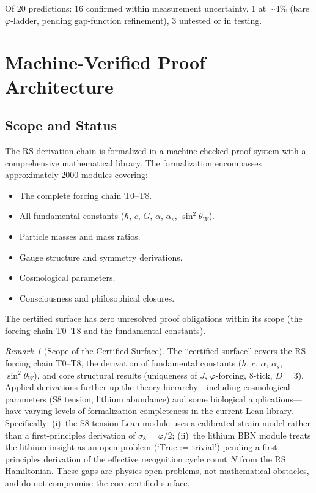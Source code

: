 \documentclass[12pt,a4paper]{article}
\theoremstyle{definition}
\theoremstyle{remark}
\newtheorem{remark}[theorem]{Remark}
\begin{document}
Of 20 predictions: 16 confirmed within measurement uncertainty,
1 at $\sim 4\%$ (bare $\varphi$-ladder, pending gap-function
refinement), 3 untested or in testing.

\section{Machine-Verified Proof Architecture}
\label{sec:architecture}

\subsection{Scope and Status}

The RS derivation chain is formalized in a machine-checked proof system
with a comprehensive mathematical library.  The formalization
encompasses approximately 2000 modules covering:
\begin{itemize}
  \item The complete forcing chain T0--T8.
  \item All fundamental constants ($\hbar$, $c$, $G$, $\alpha$,
  $\alpha_s$, $\sin^2\theta_W$).
  \item Particle masses and mass ratios.
  \item Gauge structure and symmetry derivations.
  \item Cosmological parameters.
  \item Consciousness and philosophical closures.
\end{itemize}

The certified surface has zero unresolved proof obligations within its
scope (the forcing chain T0--T8 and the fundamental constants).

\begin{remark}[Scope of the Certified Surface]
The ``certified surface'' covers the RS forcing chain T0--T8, the
derivation of fundamental constants ($\hbar$, $c$, $\alpha$,
$\alpha_s$, $\sin^2\theta_W$), and core structural results (uniqueness
of $J$, $\varphi$-forcing, 8-tick, $D = 3$).  Applied derivations
further up the theory hierarchy---including cosmological parameters
(S8 tension, lithium abundance) and some biological applications---have
varying levels of formalization completeness in the current Lean
library.  Specifically: (i)~the S8 tension Lean module uses a
calibrated strain model rather than a first-principles derivation of
$\sigma_8 = \varphi/2$; (ii)~the lithium BBN module treats the
lithium insight as an open problem (`True := trivial') pending a
first-principles derivation of the effective recognition cycle count
$N$ from the RS Hamiltonian.  These gaps are physics open problems,
not mathematical obstacles, and do not compromise the core certified
surface.
\end{remark}
\end{document}
